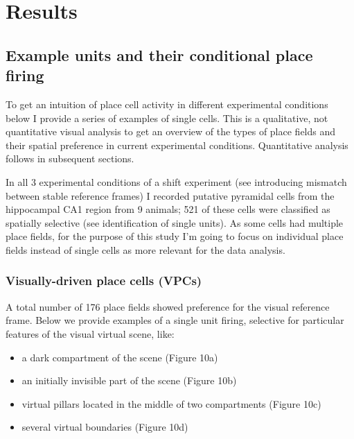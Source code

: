 \chapter{Results}
\label{ch:results}

\section{Example units and their conditional place firing}
\label{sec:example_units}

To get an intuition of place cell activity in different experimental conditions below I provide a series of examples of single cells. This is a qualitative, not quantitative visual analysis to get an overview of the types of place fields and their spatial preference in current experimental conditions. Quantitative analysis follows in subsequent sections.

In all 3 experimental conditions of a shift experiment (see introducing mismatch between stable reference frames) I recorded putative pyramidal cells from the hippocampal CA1 region from 9 animals; 521 of these cells were classified as spatially selective (see identification of single units). As some cells had multiple place fields, for the purpose of this study I’m going to focus on individual place fields instead of single cells as more relevant for the data analysis.

\subsection{Visually-driven place cells (VPCs)}

A total number of 176 place fields showed preference for the visual reference frame. Below we provide examples of a single unit firing, selective for particular features of the visual virtual scene, like:
\begin{itemize}
  \item a dark compartment of the scene (Figure 10a)
  \item an initially invisible part of the scene (Figure 10b)
  \item virtual pillars located in the middle of two compartments (Figure 10c)
  \item several virtual boundaries (Figure 10d)
\end{itemize}

